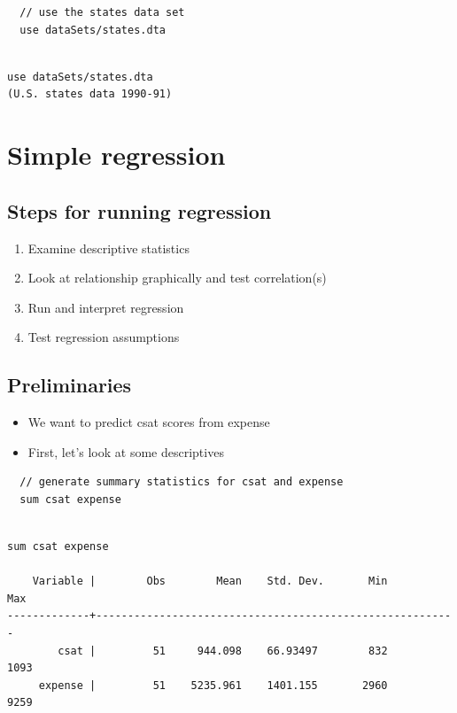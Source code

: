\documentclass[]{book}
\providecommand{\tightlist}{%
  \setlength{\itemsep}{0pt}\setlength{\parskip}{0pt}}
\begin{document}
\begin{verbatim}
  // use the states data set
  use dataSets/states.dta
\end{verbatim}

\begin{verbatim}

use dataSets/states.dta
(U.S. states data 1990-91)
\end{verbatim}

\section{Simple regression}\label{simple-regression}

\subsection{Steps for running
regression}\label{steps-for-running-regression}

\begin{enumerate}
\def\labelenumi{\arabic{enumi}.}
\tightlist
\item
  Examine descriptive statistics
\item
  Look at relationship graphically and test correlation(s)
\item
  Run and interpret regression
\item
  Test regression assumptions
\end{enumerate}

\subsection{Preliminaries}\label{preliminaries}

\begin{itemize}
\tightlist
\item
  We want to predict csat scores from expense
\item
  First, let's look at some descriptives
\end{itemize}

\begin{verbatim}
  // generate summary statistics for csat and expense
  sum csat expense
\end{verbatim}

\begin{verbatim}

sum csat expense

    Variable |        Obs        Mean    Std. Dev.       Min        Max
-------------+---------------------------------------------------------
        csat |         51     944.098    66.93497        832       1093
     expense |         51    5235.961    1401.155       2960       9259
\end{verbatim}
\end{document}
